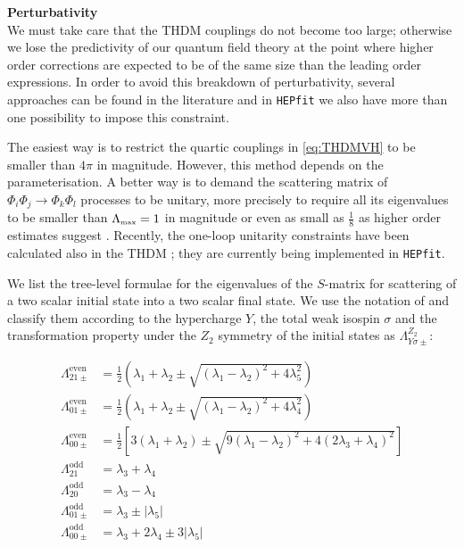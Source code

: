 \documentclass[preprint,3p,12pt]{elsarticle}
\newcommand{\HEPfit}{\texttt{HEPfit}\xspace}
\begin{document}
\textbf{Perturbativity}\\

We must take care that the THDM couplings do not become too large; otherwise we lose the predictivity of our quantum field theory at the point where higher order corrections are expected to be of the same size than the leading order expressions. In order to avoid this breakdown of perturbativity, several approaches can be found in the literature and in \HEPfit we also have more than one possibility to impose this constraint.

The easiest way is to restrict the quartic couplings in \eqref{eq:THDMVH} to be smaller than $4\pi$ in magnitude. However, this method depends on the parameterisation. A better way is to demand the scattering matrix of $\Phi_i \Phi_j\to \Phi_k \Phi_l$ processes to be unitary, more precisely to require all its eigenvalues to be smaller than $\Lambda_{\text{\tiny{max}}}=1$ in magnitude \cite{Huffel:1980sk,Maalampi:1991fb,Kanemura:1993hm,Akeroyd:2000wc,Ginzburg:2005dt} or even as small as $\frac18$ as higher order estimates suggest \cite{Baglio:2014nea,Chowdhury:2015yja}. Recently, the one-loop unitarity constraints have been calculated also in the THDM \cite{Grinstein:2015rtl}; they are currently being implemented in \HEPfit.

We list the tree-level formulae for the eigenvalues of the $S$-matrix for scattering of a two scalar initial state into a two scalar final state. We use the notation of \cite{Ginzburg:2005dt} and classify them according to the hypercharge $Y$, the total weak isospin $\sigma$ and the transformation property under the $Z_2$ symmetry of the initial states as $\Lambda _{Y\sigma \pm}^{Z_2}$:

\begin{align}
 \Lambda _{21\pm}^{\text{even}} &= \frac12 \left( \lambda_1 +\lambda_2 \pm \sqrt{(\lambda_1-\lambda_2)^2+4\lambda_5^2}\right) \nonumber \\
 \Lambda _{01\pm}^{\text{even}} &= \frac12 \left( \lambda_1 +\lambda_2 \pm \sqrt{(\lambda_1-\lambda_2)^2+4\lambda_4^2}\right) \nonumber \\
 \Lambda _{00\pm}^{\text{even}} &= \frac12 \left[ 3\left( \lambda_1 +\lambda_2 \right) \pm \sqrt{9(\lambda_1-\lambda_2)^2+4(2\lambda_3+\lambda_4)^2}\right] \nonumber \\
 \Lambda _{21}^{\text{odd}} &= \lambda_3 + \lambda_4\nonumber \\
 \Lambda _{20}^{\text{odd}} &= \lambda_3 - \lambda_4\nonumber \\
 \Lambda _{01\pm}^{\text{odd}} &= \lambda_3 \pm |\lambda_5|\nonumber \\
 \Lambda _{00\pm}^{\text{odd}} &= \lambda_3 + 2\lambda_4 \pm 3 |\lambda_5|\nonumber
\end{align}
\end{document}
